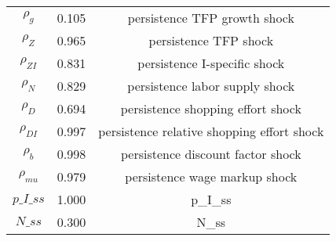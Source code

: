 \begin{center}
\begin{longtable}{ccc}
${\rho_g}$ 	 & 	 0.105 	 & 	 persistence TFP growth shock\\
${\rho_Z}$ 	 & 	 0.965 	 & 	 persistence TFP shock\\
${\rho_{ZI}}$ 	 & 	 0.831 	 & 	 persistence I-specific shock\\
${\rho_N}$ 	 & 	 0.829 	 & 	 persistence labor supply shock\\
${\rho_D}$ 	 & 	 0.694 	 & 	 persistence shopping effort shock\\
${\rho_{DI}}$ 	 & 	 0.997 	 & 	 persistence relative shopping effort shock\\
${\rho_b}$ 	 & 	 0.998 	 & 	 persistence discount factor shock\\
${\rho_{mu}}$ 	 & 	 0.979 	 & 	 persistence wage markup shock\\
$p\_I\_ss$ 	 & 	 1.000 	 & 	 p\_I\_ss\\
$N\_ss$ 	 & 	 0.300 	 & 	 N\_ss\\
\bottomrule%
\end{longtable}
\end{center}
